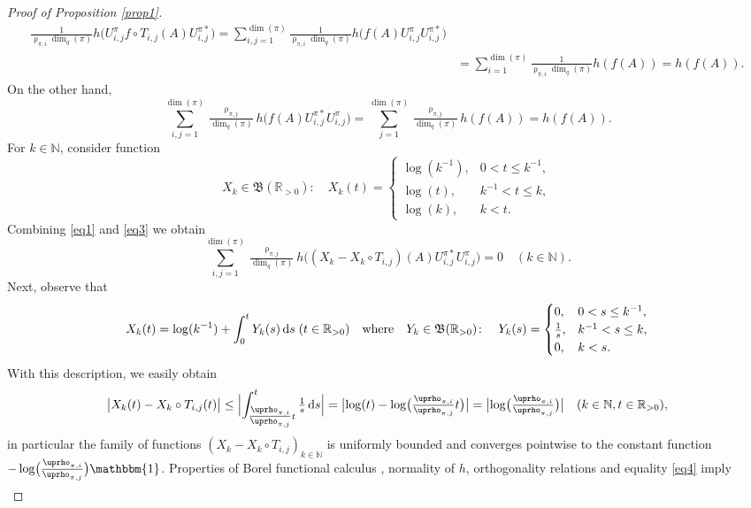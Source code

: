 \documentclass{amsart}
\newcommand{\mf}{\mathfrak}
\newcommand{\I}{\mathbbm{1}}
\newcommand{\md}{\operatorname{d}\!}
\newcommand{\NN}{\mathbb{N}}
\newcommand{\RR}{\mathbb{R}}
\theoremstyle{definition}
\numberwithin{equation}{section}
\begin{document}
\begin{proof}[Proof of Proposition \ref{prop1}]
\begin{equation}
\begin{split}
\tfrac{1}{\uprho_{\pi,i}\dim_q(\pi)}h\bigl( U^{\pi}_{i,j}
f\circ T_{i,j}(A) U^{\pi *}_{i,j}\bigr)=
\sum_{i,j=1}^{\dim(\pi)}
\tfrac{1}{\uprho_{\pi,i}\dim_q(\pi)}h\bigl( f (A) U^{\pi}_{i,j}
 U^{\pi *}_{i,j}\bigr)\\
 &=
 \sum_{i=1}^{\dim(\pi)}
\tfrac{1}{\uprho_{\pi,i}\dim_q(\pi)}h( f (A)  )=h(f(A)).
\end{split}\end{equation}
On the other hand,
\begin{equation}\label{eq3}
\sum_{i,j=1}^{\dim(\pi)}\tfrac{\uprho_{\pi,j}}{\dim_q(\pi)}
h\bigl(f(A)U^{\pi *}_{i,j} U^{\pi}_{i,j}\bigr)=
\sum_{ j=1}^{\dim(\pi)}\tfrac{\uprho_{\pi,j}}{\dim_q(\pi)}
h(f(A) )=h(f(A)).
\end{equation}
For $k\in \NN$, consider function
\[
X_k\in\mf{B}(\RR_{>0})\colon \quad X_k(t)=\begin{cases}
\log(k^{-1}), & 0<t\le k^{-1},\\
\log(t), & k^{-1} < t \le k,\\
\log(k), & k< t.
\end{cases} 
\]
Combining \eqref{eq1} and \eqref{eq3} we obtain
\begin{equation}\label{eq4}
\sum_{i,j=1}^{\dim(\pi)} \tfrac{\uprho_{\pi,j}}{\dim_q(\pi)} h\bigl( (X_k-X_k\circ T_{i,j})(A) U^{\pi *}_{i,j} U^{\pi}_{i,j}\bigr)=0\quad(k\in\NN).
\end{equation}
Next, observe that
\[
X_k(t)=\log(k^{-1}) + \int_0^{t}Y_k(s)\md s\;(t\in\RR_{>0})\quad\textnormal{where}\quad 
Y_k\in \mf{B}(\RR_{>0})\colon\quad Y_k(s)=\begin{cases}
0, & 0<s\le k^{-1},\\
\tfrac{1}{s}, & k^{-1} < s \le k,\\
0, & k< s.
\end{cases}
\]
With this description, we easily obtain
\[
\bigl|X_k(t)-X_k\circ T_{i,j}(t)\bigr|\le 
\Bigl| \int_{\tfrac{\uprho_{\pi,i}}{\uprho_{\pi,j}}t }^{t} \tfrac{1}{s}\md s\Bigr|=
\bigl|\log(t) - \log\bigl(\tfrac{\uprho_{\pi,i}}{\uprho_{\pi,j}} t\bigr)\bigr|=
\bigl| \log\bigl(\tfrac{\uprho_{\pi,i}}{\uprho_{\pi,j}}  \bigr)\bigr|\quad(k\in\NN,t\in\RR_{>0}),
\]
in particular the family of functions $(X_k-X_k\circ T_{i,j})_{k\in\NN}$ is uniformly bounded and converges pointwise to the constant function $-\log\bigl(\tfrac{\uprho_{\pi,i}}{\uprho_{\pi,j}}\bigr)\I$. Properties of Borel functional calculus \cite[Theorem 10.5]{SoltanPrimer}, normality of $h$, orthogonality relations and equality \eqref{eq4} imply
\[\begin{split}

\end{split}\]
\end{proof}
\end{document}
